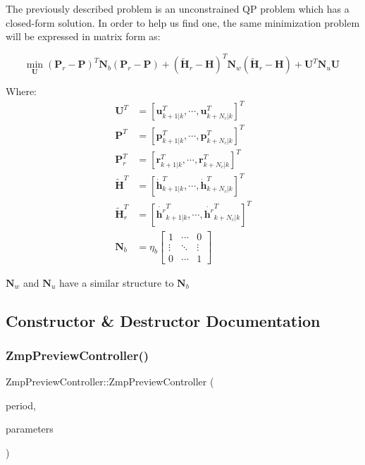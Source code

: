 The previously described problem is an unconstrained QP problem which has a closed-\/form solution. In order to help us find one, the same minimization problem will be expressed in matrix form as\+:

\[ \underset{\mathbf{U}}{\text{min}} \; (\mathbf{P}_r - \mathbf{P})^T \mathbf{N}_b (\mathbf{P}_r - \mathbf{P}) + (\tilde{\mathbf{H}}_r - \mathbf{H})^T\mathbf{N}_w(\tilde{\mathbf{H}}_r - \mathbf{H}) + \mathbf{U}^T\mathbf{N}_u \mathbf{U} \]

Where\+: \begin{align*} \mathbf{U}^T &= \left[ \mathbf{u}^T_{k+1|k}, \cdots, \mathbf{u}^T_{k+N_c|k} \right]^T \\ \mathbf{P}^T &= \left[ \mathbf{p}^T_{k+1|k}, \cdots, \mathbf{p}^T_{k+N_c|k} \right]^T \\ \mathbf{P}^T_r &= \left[ \mathbf{r}^T_{k+1|k}, \cdots, \mathbf{r}^T_{k+N_c|k} \right]^T \\ \mathbf{\tilde{H}}^T &= \left[ \dot{\mathbf{h}}^T_{k+1|k}, \cdots, \dot{\mathbf{h}}^T_{k+N_c|k} \right]^T \\ \mathbf{\tilde{H}}^T_r &= \left[ \dot{\mathbf{h}^r}^T_{k+1|k}, \cdots, \dot{\mathbf{h}^r}^T_{k+N_c|k} \right]^T \\ \mathbf{N}_b &= \eta_b\left[\begin{array}{ccc} 1 & \cdots & 0 \\ \vdots & \ddots & \vdots\\ 0 & \cdots & 1 \end{array}\right] \end{align*}

$\mathbf{N}_w$ and $\mathbf{N}_u$ have a similar structure to $\mathbf{N}_b$ 

\subsection{Constructor \& Destructor Documentation}
\hypertarget{classZmpPreviewController_af1c464b13886dc0edf2f295fc215b13c}{}\label{classZmpPreviewController_af1c464b13886dc0edf2f295fc215b13c} 
\subsubsection{\texorpdfstring{Zmp\+Preview\+Controller()}{ZmpPreviewController()}}
{\footnotesize\ttfamily Zmp\+Preview\+Controller\+::\+Zmp\+Preview\+Controller (\begin{DoxyParamCaption}\item[{const int}]{period,  }\item[{struct \hyperlink{structZmpPreviewParams}{Zmp\+Preview\+Params}}]{parameters }\end{DoxyParamCaption})}

